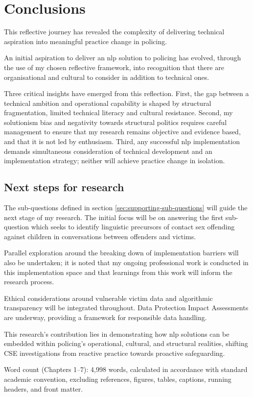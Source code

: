 \documentclass[12pt,a4paper,oneside]{report}
\begin{document}
\chapter{Conclusions}
\label{ch:conclusions}
This reflective journey has revealed the complexity of delivering technical aspiration into meaningful practice change in policing.

An initial aspiration to deliver an \gls{nlp} solution to policing has evolved, through the use of my chosen reflective framework, into recognition that there are organisational and cultural to consider in addition to technical ones.

Three critical insights have emerged from this reflection.  First, the gap between a technical ambition and operational capability is shaped by structural fragmentation, limited technical literacy and cultural resistance.  Second, my solutionism bias and negativity towards structural politics requires careful management to ensure that my research remains objective and evidence based, and that it is not led by enthusiasm.  Third, any successful \gls{nlp} implementation demands simultaneous consideration of technical development and an implementation strategy; neither will achieve practice change in isolation. 

\section{Next steps for research}
\label{sec:next-steps}
The sub-questions defined in section \ref{sec:supporting-sub-questions} will guide the next stage of my research.  The initial focus will be on answering the first sub-question which seeks to identify linguistic precursors of contact sex offending against children in conversations between offenders and victims.  

Parallel exploration around the breaking down of implementation barriers will also be undertaken; it is noted that my ongoing professional work is conducted in this implementation space and that learnings from this work will inform the research process.

Ethical considerations around vulnerable victim data and algorithmic transparency will be integrated throughout. Data Protection Impact Assessments are underway, providing a framework for responsible data handling.

This research's contribution lies in demonstrating how \gls{nlp} solutions can be embedded within policing's operational, cultural, and structural realities, shifting CSE investigations from reactive practice towards proactive safeguarding.

\clearpage

Word count (Chapters 1–7): 4,998 words, calculated in accordance with standard academic convention, excluding references, figures, tables, captions, running headers, and front matter.


\end{document}
